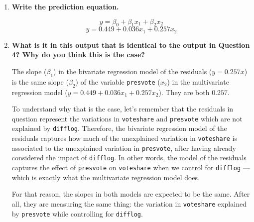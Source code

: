 \documentclass[12pt,letterpaper]{article}
\begin{document}
\begin{enumerate}
	\item \textbf{Write the prediction equation.}

		$$y = \beta_0 + \beta_1 x_1 + \beta_2 x_2$$
		$$y = 0.449 + 0.036x_1 + 0.257x_2$$

	\item \textbf{What is it in this output that is identical to the output in Question 4? Why do you think this is the case?}
	
		The slope ($\beta_1$) in the bivariate regression model of the residuals ($y=0.257x$) is the same slope ($\beta_2$) of the variable \texttt{presvote} ($x_2$) in the multivariate regression model ($y=0.449+0.036x_1+0.257x_2$). They are both $0.257$.
		
		To understand why that is the case, let's remember that the residuals in question represent the variations in \texttt{voteshare} and \texttt{presvote} which are not explained by \texttt{difflog}. Therefore, the bivariate regression model of the residuals captures how much of the unexplained variation in \texttt{voteshare} is associated to the unexplained variation in \texttt{presvote}, after having already considered the impact of \texttt{difflog}. In other words, the model of the residuals captures the effect of \texttt{presvote} on \texttt{voteshare} when we control for \texttt{difflog} --- which is exactly what the multivariate regression model does.
		
		For that reason, the slopes in both models are expected to be the same. After all, they are measuring the same thing: the variation in \texttt{voteshare} explained by \texttt{presvote} while controlling for \texttt{difflog}.

\end{enumerate}
\end{document}
